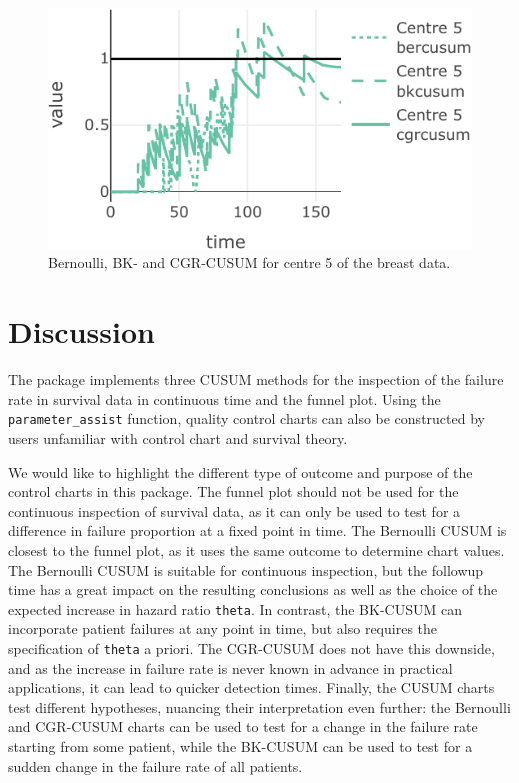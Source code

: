 \begin{figure}
\centering
\includegraphics{RJ-2023-095_files/figure-latex/EORTC3-static-1.pdf}
\caption{\label{fig:EORTC3-static}Bernoulli, BK- and CGR-CUSUM for centre 5 of the breast data.}
\end{figure}

\hypertarget{discussion}{%
\section{Discussion}\label{discussion}}

The  package implements three CUSUM methods for the inspection of the failure rate in survival data in continuous time and the funnel plot. Using the \texttt{parameter\_assist} function, quality control charts can also be constructed by users unfamiliar with control chart and survival theory.

We would like to highlight the different type of outcome and purpose of the control charts in this package. The funnel plot should not be used for the continuous inspection of survival data, as it can only be used to test for a difference in failure proportion at a fixed point in time. The Bernoulli CUSUM is closest to the funnel plot, as it uses the same outcome to determine chart values. The Bernoulli CUSUM is suitable for continuous inspection, but the followup time has a great impact on the resulting conclusions as well as the choice of the expected increase in hazard ratio \texttt{theta}. In contrast, the BK-CUSUM can incorporate patient failures at any point in time, but also requires the specification of \texttt{theta} a priori. The CGR-CUSUM does not have this downside, and as the increase in failure rate is never known in advance in practical applications, it can lead to quicker detection times. Finally, the CUSUM charts test different hypotheses, nuancing their interpretation even further: the Bernoulli and CGR-CUSUM charts can be used to test for a change in the failure rate starting from some patient, while the BK-CUSUM can be used to test for a sudden change in the failure rate of all patients.

